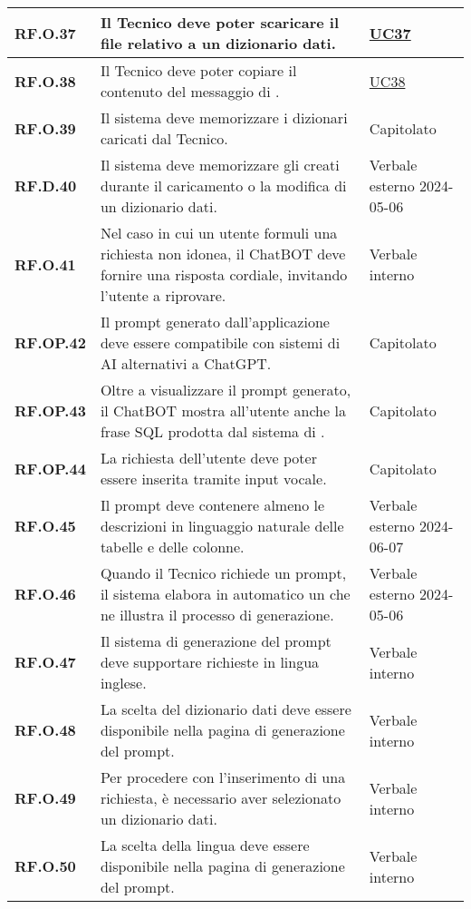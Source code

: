 \begin{adjustwidth}{-0.5cm}{-0.5cm}
\begin{longtable}{|P{3cm}|P{6,5cm}|>{\arraybackslash}P{4cm}|}
    \hline
    \textbf{RF.O.37} & Il Tecnico deve poter scaricare il file relativo a un dizionario dati. & \hyperref[UC37]{UC37} \\
    \hline
    \textbf{RF.O.38} & Il Tecnico deve poter copiare il contenuto del messaggio di .  & \hyperref[UC38]{UC38} \\
    \hline
    \textbf{RF.O.39} & Il sistema deve memorizzare i dizionari caricati dal Tecnico. & Capitolato \\
    \hline
    \textbf{RF.D.40} & Il sistema deve memorizzare gli  creati durante il caricamento o la modifica di un dizionario dati. & Verbale esterno 2024-05-06\\
    \hline
    \textbf{RF.O.41} & Nel caso in cui un utente formuli una richiesta non idonea, il ChatBOT deve fornire una risposta cordiale, invitando l'utente a riprovare. & Verbale interno \\
    \hline
    \textbf{RF.OP.42} & Il prompt generato dall'applicazione deve essere compatibile con sistemi di AI alternativi a ChatGPT. & Capitolato \\
    \hline
    \textbf{RF.OP.43} & Oltre a visualizzare il prompt generato, il ChatBOT mostra all'utente anche la frase SQL prodotta dal sistema di . & Capitolato \\
    \hline
    \textbf{RF.OP.44} & La richiesta dell'utente deve poter essere inserita tramite input vocale. & Capitolato \\
    \hline
    \textbf{RF.O.45} & Il prompt deve contenere almeno le descrizioni in linguaggio naturale delle tabelle e delle colonne. & Verbale esterno 2024-06-07\\
    \hline
    \textbf{RF.O.46} & Quando il Tecnico richiede un prompt, il sistema elabora in automatico un  che ne illustra il processo di generazione. & Verbale esterno 2024-05-06 \\
    \hline
    \textbf{RF.O.47} & Il sistema di generazione del prompt deve supportare richieste in lingua inglese. & Verbale interno \\
    \hline
    \textbf{RF.O.48} & La scelta del dizionario dati deve essere disponibile nella pagina di generazione del prompt. & Verbale interno \\
    \hline
    \textbf{RF.O.49} & Per procedere con l'inserimento di una richiesta, è necessario aver selezionato un dizionario dati. & Verbale interno \\
    \hline
    \textbf{RF.O.50} & La scelta della lingua deve essere disponibile nella pagina di generazione del prompt. & Verbale interno \\

\end{longtable}
\end{adjustwidth}
